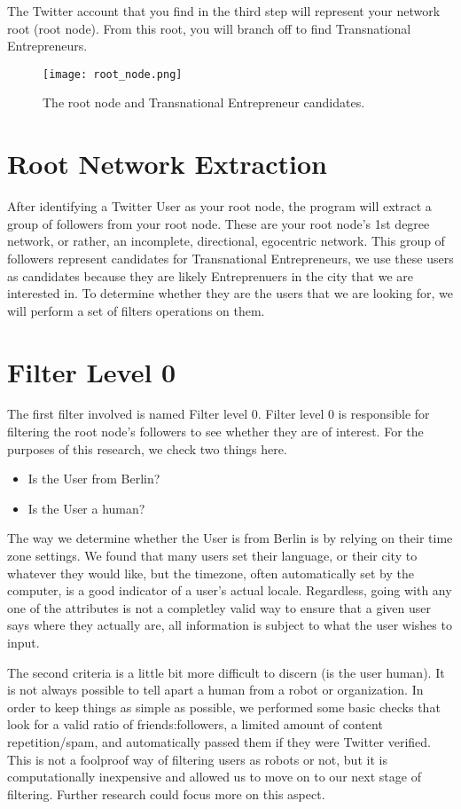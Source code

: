 The Twitter account that you find in the third step will represent
your network root (root node). From this root, you will branch off to
find Transnational Entrepreneurs.

\begin{figure}[H]
  \centering
  \texttt{[image: root\_node.png]}
  \caption{The root node and Transnational Entrepreneur candidates.}
\end{figure}

\section{Root Network Extraction}
After identifying a Twitter User as your root node, the program will
extract a group of followers from your root node. These are your root
node's 1st degree network, or rather, an incomplete, directional,
egocentric network. This group of followers represent candidates for
Transnational Entrepreneurs, we use these users as candidates because
they are likely Entreprenuers in the city that we are interested in.
To determine whether they are the users that we are looking for, we
will perform a set of filters operations on them.

\section{Filter Level 0}
The first filter involved is named Filter level 0. Filter level 0 is
responsible for filtering the root node's followers to see whether
they are of interest. For the purposes of this research, we check two
things here.

\begin{itemize}
\item Is the User from Berlin?
\item Is the User a human?
\end{itemize}

The way we determine whether the User is from Berlin is by relying on
their time zone settings. We found that many users set their language,
or their city to whatever they would like, but the timezone, often
automatically set by the computer, is a good indicator of a user's
actual locale. Regardless, going with any one of the attributes is not
a completley valid way to ensure that a given user says where they
actually are, all information is subject to what the user wishes to
input.

The second criteria is a little bit more difficult to discern (is the
user human). It is not always possible to tell apart a human from a
robot or organization. In order to keep things as simple as possible,
we performed some basic checks that look for a valid ratio of
friends:followers, a limited amount of content repetition/spam, and
automatically passed them if they were Twitter verified. This is not a
foolproof way of filtering users as robots or not, but it is
computationally inexpensive and allowed us to move on to our next
stage of filtering. Further research could focus more on this aspect.

